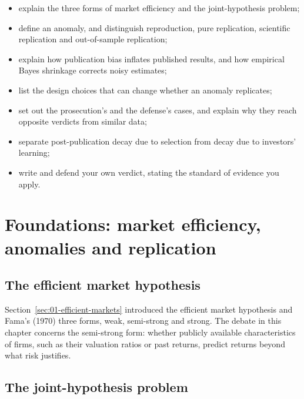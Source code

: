\begin{itemize}
  \item explain the three forms of market efficiency and the joint-hypothesis problem;
  \item define an anomaly, and distinguish reproduction, pure replication, scientific replication and out-of-sample replication;
  \item explain how publication bias inflates published results, and how empirical Bayes shrinkage corrects noisy estimates;
  \item list the design choices that can change whether an anomaly replicates;
  \item set out the prosecution's and the defense's cases, and explain why they reach opposite verdicts from similar data;
  \item separate post-publication decay due to selection from decay due to investors' learning;
  \item write and defend your own verdict, stating the standard of evidence you apply.
\end{itemize}

\section{Foundations: market efficiency, anomalies and replication}
\label{sec:10-foundations}

\subsection{The efficient market hypothesis}

Section~\ref{sec:01-efficient-markets} introduced the efficient market hypothesis and Fama's (1970) three forms, weak, semi-strong and strong. The debate in this chapter concerns the semi-strong form: whether publicly available characteristics of firms, such as their valuation ratios or past returns, predict returns beyond what risk justifies.

\subsection{The joint-hypothesis problem}

